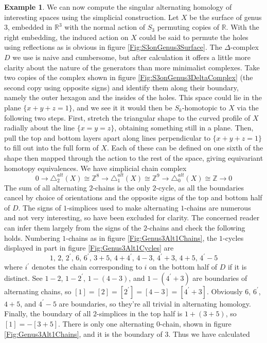 \documentclass[11pt,a4paper,twoside]{article}
\theoremstyle{plain}
\theoremstyle{definition}
\theoremstyle{definition}
\theoremstyle{definition}
\theoremstyle{definition}
\newtheorem{example}[thm]{Example}
\theoremstyle{definition}
\begin{document}
\begin{example}
We can now compute the singular alternating homology of interesting spaces using the simplicial construction. Let $X$ be the surface of genus $3$, embedded in $\mathbb{R}^3$ with the normal action of $S_3$ permuting copies of $\mathbb{R}$. With the right embedding, the induced action on $X$ could be said to permute the holes using reflections as is obvious in figure \ref{Fig:S3onGenus3Surface}. The $\Delta$-complex $D$ we use is naive and cumbersome, but after calculation it offers a little more clarity about the nature of the generators than more minimalist complexes. Take two copies of the complex shown in figure \ref{Fig:S3onGenus3DeltaComplex} (the second copy using opposite signs) and identify them along their boundary, namely the outer hexagon and the insides of the holes. This space could lie in the plane $\{x+y+z=1\}$, and we see it it would then be $S_k$-homotopic to $X$ via the following two steps. First, stretch the triangular shape to the curved profile of $X$ radially about the line $\{x=y=z\}$, obtaining something still in a plane. Then, pull the top and bottom layers apart along lines perpendicular to $\{x+y+z=1\}$ to fill out into the full form of $X$. Each of these can be defined on one sixth of the shape then mapped through the action to the rest of the space, giving equivariant homotopy equivalences. We have simplicial chain complex
$$0\longrightarrow\triangle_2^{alt}(X)\cong\mathbb{Z}^8\longrightarrow\triangle_1^{alt}(X)\cong\mathbb{Z}^9\longrightarrow\triangle_0^{alt}(X)\cong\mathbb{Z}\longrightarrow0$$
The sum of all alternating $2$-chains is the only $2$-cycle, as all the boundaries cancel by choice of orientations and the opposite signs of the top and bottom half of $D$. The signs of $1$-simplices used to make alternating $1$-chains are numerous and not very interesting, so have been excluded for clarity. The concerned reader can infer them largely from the signs of the $2$-chains and check the following holds. Numbering $1$-chains as in figure \ref{Fig:Genus3Alt1Chains}, the $1$-cycles displayed in part in figure \ref{Fig:Genus3Alt1Cycles} are
$$1,\,2,\,2^\prime,\,6,\,6^\prime,\,3+5,\,4+4^\prime,\,4-3,\,4^\prime+3,\,4+5,\,4^\prime-5$$
where $i^\prime$ denotes the chain corresponding to $i$ on the bottom half of $D$ if it is distinct. See $1-2$, $1-2^\prime$, $1-(4-3)$, and $1-(4^\prime+3)$ are boundaries of alternating chains, so $[1]=[2]=[2^\prime]=[4-3]=[4^\prime+3]$. Obviously $6$, $6^\prime$, $4+5$, and $4^\prime-5$ are boundaries, so they're all trivial in alternating homology. Finally, the boundary of all $2$-simplices in the top half is $1+(3+5)$, so $[1]=-[3+5]$. There is only one alternating $0$-chain, shown in figure \ref{Fig:Genus3Alt1Chains}, and it is the boundary of $3$. Thus we have calculated

\end{example}
\end{document}
